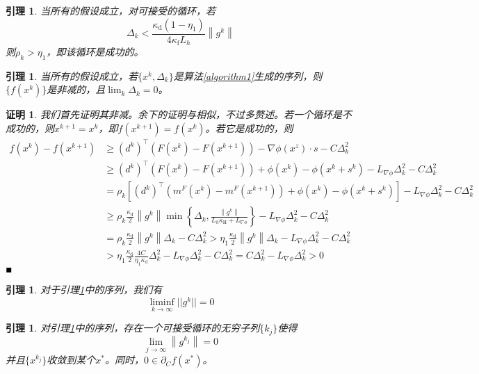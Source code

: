 \documentclass[macfonts]{njuthesis}
\newtheorem{lem}[thm]{引理}
\newtheorem*{Proof}{证明}
\begin{document}
\begin{lem}
当所有的假设成立，对可接受的循环，若
\begin{equation}
\label{deltakbdd}
\Delta_{k}<\frac{\kappa_{\mathrm{d}}\left(1-\eta_{1}\right)}{4 \kappa_{\mathrm{f}} L_{h}}\left\|g^{k}\right\|
\end{equation}
则$\rho_k>\eta_1$，即该循环是成功的。
\end{lem}


\begin{lem}
\label{deltatozero}
当所有的假设成立，若$\{x^k,\Delta_k\}$是算法\ref{algorithm1}生成的序列，则$\{f(x^k)\}$是非减的，且$\lim_k \Delta_k=0$。
\end{lem}
\begin{Proof}
我们首先证明其非减。余下的证明与\cite{manifold}相似，不过多赘述。若一个循环是不成功的，则$x^{k+1}=x^k$，即$f(x^{k+1})=f(x^k)$。若它是成功的，则
$$
\begin{aligned}
f(x^{k})-f(x^{k+1}) & \geq\left(d^{k}\right)^{\top}\left(F(x^{k})-F(x^{k+1})\right)-\nabla\phi(x^z)\cdot s-C \Delta_{k}^{2} \\
&\geq \left(d^{k}\right)^{\top}\left(F(x^{k})-F(x^{k+1})\right)+\phi(x^k)-\phi(x^k+s^k)-L_{\nabla\phi}\Delta_k^2-C \Delta_{k}^{2} \\
&=\rho_{k}\left[\left(d^{k}\right)^{\top}\left(m^F(x^{k})-m^F(x^{k+1})\right)+\phi(x^k)-\phi(x^k+s^k)\right]-L_{\nabla\phi}\Delta_k^2-C \Delta_{k}^{2} \\
& \geq \rho_{k} \frac{\kappa_{\mathrm{d}}}{2}\left\|g^{k}\right\| \min \left\{\Delta_{k}, \frac{\left\|g^{k}\right\|}{L_{h} \kappa_{\mathrm{H}}+L_{\nabla\phi}}\right\}-L_{\nabla\phi}\Delta_k^2-C \Delta_{k}^{2} \\
&=\rho_{k} \frac{\kappa_{\mathrm{d}}}{2}\left\|g^{k}\right\| \Delta_{k}-C \Delta_{k}^{2}>\eta_{1} \frac{\kappa_{\mathrm{d}}}{2}\left\|g^{k}\right\| \Delta_{k}-L_{\nabla\phi}\Delta_k^2-C \Delta_{k}^{2} \\
&>\eta_{1} \frac{\kappa_{\mathrm{d}}}{2} \frac{4 C}{\eta_{1} \kappa_{\mathrm{d}}} \Delta_{k}^{2}-L_{\nabla\phi}\Delta_k^2-C \Delta_{k}^{2}=C \Delta_{k}^{2}-L_{\nabla\phi}\Delta_k^2>0
\end{aligned}
$$
$\hfill\blacksquare$
\end{Proof}

\begin{lem}
\label{liminfg}
对于引理\ref{deltatozero}中的序列，我们有
$$
\liminf_{k\to \infty} ||g^k||=0
$$
\end{lem}

\begin{lem}
\label{substationary}
对引理\ref{deltatozero}中的序列，存在一个可接受循环的无穷子列$\{k_j\}$使得
$$
\lim _{j \rightarrow \infty}\left\|g^{k_{j}}\right\|=0
$$
并且$\{x^{k_j}\}$收敛到某个$x^*$。同时，$0\in \partial_Cf(x^*)$。
\end{lem}
\end{document}
